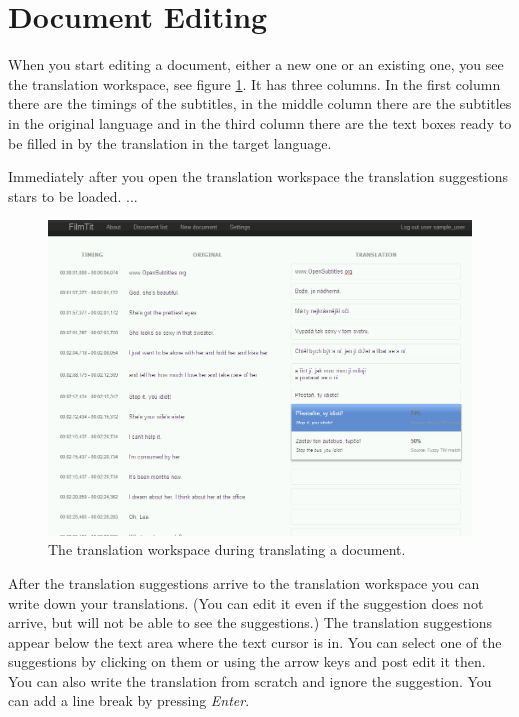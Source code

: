 \section{Document Editing}
\label{sec:document_editing}

When you start editing a document, either a new one or an existing one, you see the translation workspace, see figure \ref{fig:translation_workspace}. It has three columns. In the first column there are the timings of the subtitles, in the middle column there are the subtitles in the original language and in the third column there are the text boxes ready to be filled in by the translation in the target language.

Immediately after you open the translation workspace the translation suggestions stars to be loaded.  ...

\begin{figure}
\begin{center}
\includegraphics[scale=0.4]{figures/user_manual/translation_workspace.png}
\end{center}
\caption{The translation workspace during translating a document.}
\label{fig:translation_workspace}
\end{figure}

After the translation suggestions arrive to the translation workspace you can write down your translations.  (You can edit it even if the suggestion does not arrive, but will not be able to see the suggestions.) The translation suggestions appear below the text area where the text cursor is in. You can select one of the suggestions by clicking on them or using the arrow keys and post edit it then. You can also write the translation from scratch and ignore the suggestion. You can add a line break by pressing \emph{Enter}.

